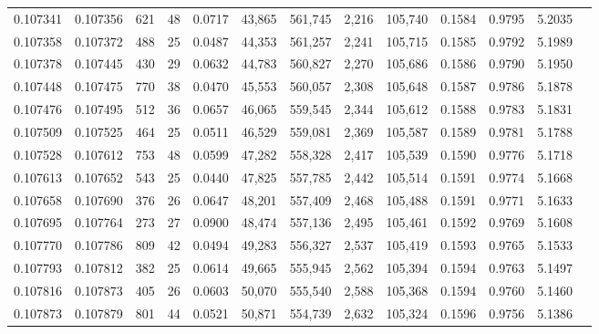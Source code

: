\begin{tabular}{rrrrrrrrrrrrr}
0.107341 & 0.107356 &   621 &  48 &                                     0.0717 &  43,865 & 561,745 &   2,216 & 105,740 & 0.1584 & 0.9795 & 5.2035 \\
0.107358 & 0.107372 &   488 &  25 &                                     0.0487 &  44,353 & 561,257 &   2,241 & 105,715 & 0.1585 & 0.9792 & 5.1989 \\
0.107378 & 0.107445 &   430 &  29 &                                     0.0632 &  44,783 & 560,827 &   2,270 & 105,686 & 0.1586 & 0.9790 & 5.1950 \\
0.107448 & 0.107475 &   770 &  38 &                                     0.0470 &  45,553 & 560,057 &   2,308 & 105,648 & 0.1587 & 0.9786 & 5.1878 \\
0.107476 & 0.107495 &   512 &  36 &                                     0.0657 &  46,065 & 559,545 &   2,344 & 105,612 & 0.1588 & 0.9783 & 5.1831 \\
0.107509 & 0.107525 &   464 &  25 &                                     0.0511 &  46,529 & 559,081 &   2,369 & 105,587 & 0.1589 & 0.9781 & 5.1788 \\
0.107528 & 0.107612 &   753 &  48 &                                     0.0599 &  47,282 & 558,328 &   2,417 & 105,539 & 0.1590 & 0.9776 & 5.1718 \\
0.107613 & 0.107652 &   543 &  25 &                                     0.0440 &  47,825 & 557,785 &   2,442 & 105,514 & 0.1591 & 0.9774 & 5.1668 \\
0.107658 & 0.107690 &   376 &  26 &                                     0.0647 &  48,201 & 557,409 &   2,468 & 105,488 & 0.1591 & 0.9771 & 5.1633 \\
0.107695 & 0.107764 &   273 &  27 &                                     0.0900 &  48,474 & 557,136 &   2,495 & 105,461 & 0.1592 & 0.9769 & 5.1608 \\
0.107770 & 0.107786 &   809 &  42 &                                     0.0494 &  49,283 & 556,327 &   2,537 & 105,419 & 0.1593 & 0.9765 & 5.1533 \\
0.107793 & 0.107812 &   382 &  25 &                                     0.0614 &  49,665 & 555,945 &   2,562 & 105,394 & 0.1594 & 0.9763 & 5.1497 \\
0.107816 & 0.107873 &   405 &  26 &                                     0.0603 &  50,070 & 555,540 &   2,588 & 105,368 & 0.1594 & 0.9760 & 5.1460 \\
0.107873 & 0.107879 &   801 &  44 &                                     0.0521 &  50,871 & 554,739 &   2,632 & 105,324 & 0.1596 & 0.9756 & 5.1386 \\

\end{tabular}
